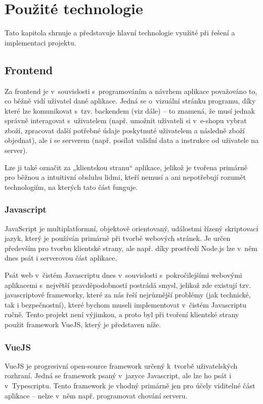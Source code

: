 \chapter{Použité technologie}
Tato kapitola shrnuje a představuje hlavní technologie využité při řešení a implementaci projektu.

\section{Frontend}
Za frontend je v~souvislosti s~programováním a návrhem aplikace považováno to, co běžně vidí uživatel dané aplikace. Jedná se o~vizuální stránku programu, díky které lze komunikovat s~tzv. backendem (viz dále) – to znamená, že musí jednak správně interagovat s~uživatelem (např. umožnit uživateli si v~e-shopu vybrat zboží, zpracovat další potřebné údaje poskytnuté uživatelem a následně zboží objednat), ale i se serverem (např. posílat validní data a instrukce od uživatele na server).

Lze ji také označit za „klientskou stranu“ aplikace, jelikož je tvořena primárně pro běžnou a intuitivní obsluhu lidmi, kteří nemusí a ani nepotřebují rozumět technologiím, na kterých tato část funguje. \cite{FEvsBE}

	\subsection{Javascript}
	JavaScript je multiplatformní, objektově orientovaný, událostmi řízený skriptovací jazyk, který je používán primárně při tvorbě webových stránek. Je určen především pro tvorbu klientské strany, ale např. díky prostředí Node.js lze v~něm dnes psát i serverovou část aplikace. \cite{JS1}\cite{JS2}
	
	Psát web v~čistém Javascriptu dnes v~souvislosti s~pokročilejšími webovými aplikacemi s~největší pravděpodobností postrádá smysl, jelikož zde existují tzv. javascriptové frameworky, které za nás řeší nejrůznější problémy (jak technické, tak i bezpečnostní), které bychom museli implementovat v~čistém Javascriptu ručně. Tento projekt není výjimkou, a proto byl při tvoření klientské strany použit framework VueJS, který je představen níže.
	
	\subsection{VueJS}
	VueJS je progresivní open-source framework určený k~tvorbě uživatelských rozhraní. Jedná se framework psaný v~jazyce Javascript, ale lze ho psát i v~Typescriptu. Tento framework je vhodný primárně jen pro účely viditelné část aplikace – nelze v~něm např. programovat chování serveru. \cite{VueJS1}
	
